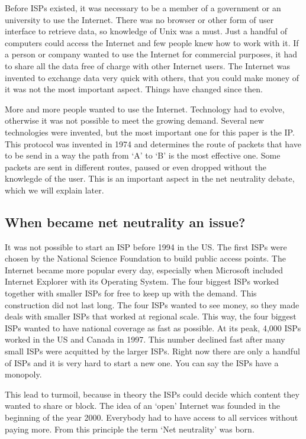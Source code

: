 Before \acp{ISP} existed, it was necessary to be a member of a government or an university to use the Internet. There was no browser or other form of user interface to retrieve data, so knowledge of Unix was a must. Just a handful of computers could access the Internet and few people knew how to work with it. If a person or company wanted to use the Internet for commercial purposes, it had to share all the data free of charge with other Internet users. The Internet was invented to exchange data very quick with others, that you could make money of it was not the most important aspect. Things have changed since then.

More and more people wanted to use the Internet. Technology had to evolve, otherwise it was not possible to meet the growing demand. Several new technologies were invented, but the most important one for this paper is the \acf{IP}. This protocol was invented in 1974 and determines the route of packets that have to be send in a way the path from `A' to `B' is the most effective one. Some packets are sent in different routes, paused or even dropped without the knowlegde of the user. This is an important aspect in the net neutrality debate, which we will explain later.

\subsection{When became net neutrality an issue?}
It was not possible to start an \ac{ISP} before 1994 in the US. The first \acp{ISP} were chosen by the National Science Foundation to build public access points. The Internet became more popular every day, especially when Microsoft included Internet Explorer with its Operating System. The four biggest \acp{ISP} worked together with smaller \acp{ISP} for free to keep up with the demand. This construction did not last long. The four \acp{ISP} wanted to see money, so they made deals with smaller \acp{ISP} that worked at regional scale. This way, the four biggest \acp{ISP} wanted to have national coverage as fast as possible. At its peak, 4,000 \acp{ISP} worked in the US and Canada in 1997. This number declined fast after many small \acp{ISP} were acquitted by the larger \acp{ISP}. Right now there are only a handful of \acp{ISP} and it is very hard to start a new one. You can say the \acp{ISP} have a monopoly.

This lead to turmoil, because in theory the \acp{ISP} could decide which content they wanted to share or block. The idea of an `open' Internet was founded in the beginning of the year 2000. Everybody had to have access to all services without paying more. From this principle the term `Net neutrality' was born.